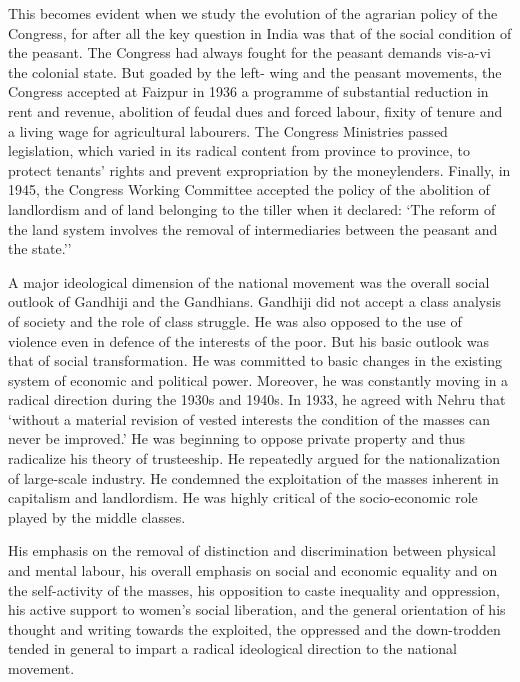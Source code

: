 This becomes evident when we study the evolution of the agrarian policy of the Congress, for after all the key question in India was that of the social condition of the peasant. The Congress had always fought for the peasant demands vis-a-vi the colonial state. But goaded by the left- wing and the peasant movements, the Congress accepted at Faizpur in 1936 a programme of substantial reduction in rent and revenue, abolition of feudal dues and forced labour, fixity of tenure and a living wage for agricultural labourers. The Congress Ministries passed legislation, which varied in its radical content from province to province, to protect tenants' rights and prevent expropriation by the moneylenders. Finally, in 1945, the Congress Working Committee accepted the policy of the abolition of landlordism and of land belonging to the tiller when it declared: `The reform of the land system involves the removal of intermediaries between the peasant and the state.''

A major ideological dimension of the national movement was the overall social outlook of Gandhiji and the Gandhians. Gandhiji did not accept a class analysis of society and the role of class struggle. He was also opposed to the use of violence even in defence of the interests of the poor. But his basic outlook was that of social transformation. He was committed to basic changes in the existing system of economic and political power. Moreover, he was constantly moving in a radical direction during the 1930s and 1940s. In 1933, he agreed with Nehru that `without a material revision of vested interests the condition of the masses can never be improved.' He was beginning to oppose private property and thus radicalize his theory of trusteeship. He repeatedly argued for the nationalization of large-scale industry. He condemned the exploitation of the masses inherent in capitalism and landlordism. He was highly critical of the socio-economic role played by the middle classes.

His emphasis on the removal of distinction and discrimination between physical and mental labour, his overall emphasis on social and economic equality and on the self-activity of the masses, his opposition to caste inequality and oppression, his active support to women's social liberation, and the general orientation of his thought and writing towards the exploited, the oppressed and the down-trodden tended in general to impart a radical ideological direction to the national movement.


